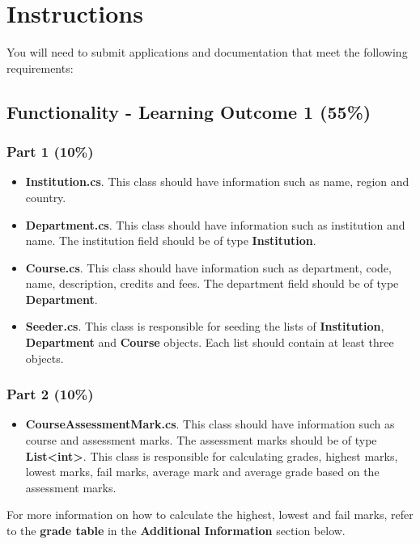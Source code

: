 \documentclass{article}
\begin{document}
\section*{Instructions}
You will need to submit applications and documentation that meet the following requirements:

\subsection*{Functionality - Learning Outcome 1 (55\%)}

\subsubsection*{Part 1 (10\%)}

\begin{itemize}
    \item \textbf{Institution.cs}. This class should have information such as name, region and country.
    \item \textbf{Department.cs}. This class should have information such as institution and name. The institution field should be of type \textbf{Institution}.
    \item \textbf{Course.cs}. This class should have information such as department, code, name, description, credits and fees. The department field should be of type \textbf{Department}.
    \item \textbf{Seeder.cs}. This class is responsible for seeding the lists of \textbf{Institution}, \textbf{Department} and \textbf{Course} objects. Each list should contain at least three objects. 
\end{itemize}

\subsubsection*{Part 2 (10\%)}

\begin{itemize}
    \item \textbf{CourseAssessmentMark.cs}. This class should have information such as course and assessment marks. The assessment marks should be of type \textbf{List<int>}. This class is responsible for calculating grades, highest marks, lowest marks, fail marks, average mark and average grade based on the assessment marks. 
\end{itemize}

For more information on how to calculate the highest, lowest and fail marks, refer to the \textbf{grade table} in the \textbf{Additional Information} section below.
\end{document}

